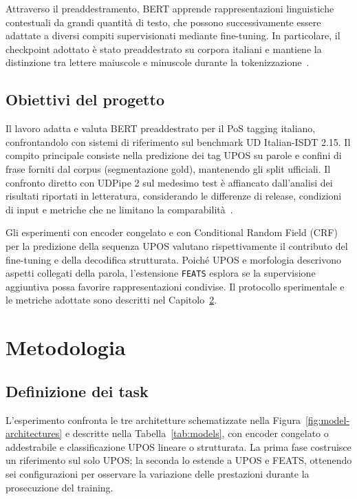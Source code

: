\documentclass[12pt,a4paper]{report}
\begin{document}
Attraverso il preaddestramento, BERT apprende rappresentazioni linguistiche contestuali da grandi quantità di testo, che possono successivamente essere adattate a diversi compiti supervisionati mediante fine-tuning. In particolare, il checkpoint adottato è stato preaddestrato su corpora italiani e mantiene la distinzione tra lettere maiuscole e minuscole durante la tokenizzazione~\cite{model}.

\section{Obiettivi del progetto}
\label{sec:project-objectives}

Il lavoro adatta e valuta BERT preaddestrato per il PoS tagging italiano, confrontandolo con sistemi di riferimento sul benchmark UD Italian-ISDT 2.15. Il compito principale consiste nella predizione dei tag UPOS su parole e confini di frase forniti dal corpus (segmentazione gold), mantenendo gli split ufficiali. Il confronto diretto con UDPipe 2 sul medesimo test è affiancato dall'analisi dei risultati riportati in letteratura, considerando le differenze di release, condizioni di input e metriche che ne limitano la comparabilità~\cite{isdt,udpipe}.

Gli esperimenti con encoder congelato e con Conditional Random Field (CRF) per la predizione della sequenza UPOS valutano rispettivamente il contributo del fine-tuning e della decodifica strutturata. Poiché UPOS e morfologia descrivono aspetti collegati della parola, l'estensione \texttt{FEATS} esplora se la supervisione aggiuntiva possa favorire rappresentazioni condivise. Il protocollo sperimentale e le metriche adottate sono descritti nel Capitolo~\ref{chap:methodology}.

\chapter{Metodologia}
\label{chap:methodology}

\section{Definizione dei task}
\label{sec:method-experimental-design}

L'esperimento confronta le tre architetture schematizzate nella Figura~\ref{fig:model-architectures} e descritte nella Tabella~\ref{tab:models}, con encoder congelato o addestrabile e classificazione UPOS lineare o strutturata. La prima fase costruisce un riferimento sul solo UPOS; la seconda lo estende a UPOS e FEATS, ottenendo sei configurazioni per osservare la variazione delle prestazioni durante la prosecuzione del training.
\end{document}
